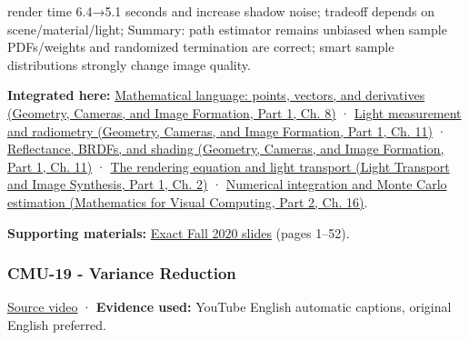 render time 6.4→5.1 seconds and increase shadow noise; tradeoff depends on scene/material/light; Summary: path estimator remains unbiased when sample PDFs/weights and randomized termination are correct; smart sample distributions strongly change image quality.

\textbf{Integrated here:} \href{../03-Geometry-Cameras-and-Image-Formation-P01/main.pdf\#nameddest=03-visual-computing-i-ch001-mathematical-language-points-vectors-and-derivatives}{Mathematical language: points, vectors, and derivatives (Geometry, Cameras, and Image Formation, Part 1, Ch. 8)} · \href{../03-Geometry-Cameras-and-Image-Formation-P01/main.pdf\#nameddest=03-visual-computing-i-ch004-light-measurement-and-radiometry}{Light measurement and radiometry (Geometry, Cameras, and Image Formation, Part 1, Ch. 11)} · \href{../03-Geometry-Cameras-and-Image-Formation-P01/main.pdf\#nameddest=03-visual-computing-i-ch004-reflectance-brdfs-and-shading}{Reflectance, BRDFs, and shading (Geometry, Cameras, and Image Formation, Part 1, Ch. 11)} · \href{../04-Light-Transport-and-Image-Synthesis-P01/main.pdf\#nameddest=03-visual-computing-i-ch007-the-rendering-equation-and-light-transport}{The rendering equation and light transport (Light Transport and Image Synthesis, Part 1, Ch. 2)} · \href{../02-Mathematics-for-Visual-Computing-P02/main.pdf\#nameddest=03-visual-computing-i-ch012-numerical-integration-and-monte-carlo-estimation}{Numerical integration and Monte Carlo estimation (Mathematics for Visual Computing, Part 2, Ch. 16)}.

\textbf{Supporting materials:} \href{https://15462.courses.cs.cmu.edu/fall2020content/lectures/18_montecarloraytracing/18_montecarloraytracing_slides.pdf}{Exact Fall 2020 slides} (pages 1--52).

\subsubsection{CMU-19 - Variance Reduction}\label{04-visual-computing-ii-ch036-cmu-19---variance-reduction}

\hypertarget{04-visual-computing-ii-ch036-cmu-19---variance-reduction}{}

\href{https://www.youtube.com/watch?v=IQhLk_XaFc8}{Source video} · \textbf{Evidence used:} YouTube English automatic captions, original English preferred.

